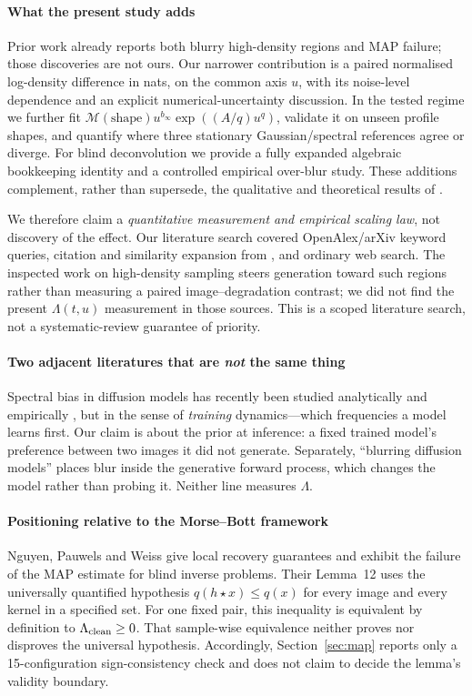 \documentclass[10pt,journal]{IEEEtran}
\newcommand{\blur}{\star}
\newcommand{\Lam}{\Lambda}
\begin{document}
\paragraph*{What the present study adds}
Prior work already reports both blurry high-density regions and MAP failure; those discoveries
are not ours. Our narrower contribution is a paired normalised log-density difference in nats,
on the common axis $u$, with its noise-level dependence and an explicit numerical-uncertainty
discussion. In the tested regime we further fit
$\mathcal M(\mathrm{shape})u^{b_\infty}\exp((A/q)u^q)$, validate it on unseen profile shapes, and quantify
where three stationary Gaussian/spectral references agree or diverge. For blind deconvolution we provide a
fully expanded algebraic bookkeeping identity and a controlled empirical over-blur study. These
additions complement, rather than supersede, the qualitative and theoretical results of
\cite{nguyen2025morsebott,karczewski2025cartoonists}.

We therefore claim a \emph{quantitative measurement and empirical scaling law}, not discovery
of the effect. Our literature search covered OpenAlex/arXiv keyword queries, citation and
similarity expansion from \cite{nguyen2025morsebott,karczewski2025cartoonists,karras2022edm},
and ordinary web search. The inspected work on high-density sampling steers generation toward
such regions rather than measuring a paired image--degradation contrast; we did not find the
present $\Lam(t,u)$ measurement in those sources. This is a scoped literature search, not a
systematic-review guarantee of priority.

\paragraph*{Two adjacent literatures that are \emph{not} the same thing}
Spectral bias in diffusion models has recently been studied analytically and empirically
\cite{wang2025spectralbias,urfin2026spectralbias}, but in the sense of \emph{training}
dynamics---which frequencies a model learns first. Our claim is about the prior at inference:
a fixed trained model's preference between two images it did not generate. Separately,
``blurring diffusion models'' \cite{hoogeboom2023blurring} places blur inside the generative
forward process, which changes the model rather than probing it. Neither line measures
$\Lambda$.

\paragraph*{Positioning relative to the Morse--Bott framework}
Nguyen, Pauwels and Weiss \cite{nguyen2025morsebott} give local recovery guarantees and exhibit
the failure of the MAP estimate for blind inverse problems. Their Lemma~12 uses the universally
quantified hypothesis $q(h\blur x)\le q(x)$ for every image and every kernel in a specified set.
For one fixed pair, this inequality is equivalent by definition to $\Lam_{\rm clean}\ge0$. That
sample-wise equivalence neither proves nor disproves the universal hypothesis. Accordingly,
Section~\ref{sec:map} reports only a 15-configuration sign-consistency check and does not claim
to decide the lemma's validity boundary.
\end{document}
